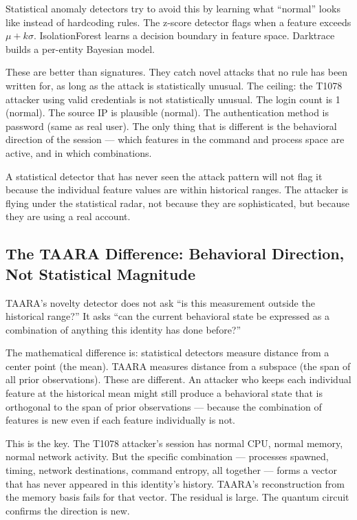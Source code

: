 \documentclass[11pt,a4paper]{article}
\begin{document}
Statistical anomaly detectors try to avoid this by learning what ``normal'' looks like instead of hardcoding rules. The z-score detector flags when a feature exceeds $\mu + k\sigma$. IsolationForest learns a decision boundary in feature space. Darktrace builds a per-entity Bayesian model.

These are better than signatures. They catch novel attacks that no rule has been written for, as long as the attack is statistically unusual. The ceiling: the T1078 attacker using valid credentials is not statistically unusual. The login count is 1 (normal). The source IP is plausible (normal). The authentication method is password (same as real user). The only thing that is different is the behavioral direction of the session — which features in the command and process space are active, and in which combinations.

A statistical detector that has never seen the attack pattern will not flag it because the individual feature values are within historical ranges. The attacker is flying under the statistical radar, not because they are sophisticated, but because they are using a real account.

\subsection{The TAARA Difference: Behavioral Direction, Not Statistical Magnitude}

TAARA's novelty detector does not ask ``is this measurement outside the historical range?'' It asks ``can the current behavioral state be expressed as a combination of anything this identity has done before?''

The mathematical difference is: statistical detectors measure distance from a center point (the mean). TAARA measures distance from a subspace (the span of all prior observations). These are different. An attacker who keeps each individual feature at the historical mean might still produce a behavioral state that is orthogonal to the span of prior observations — because the combination of features is new even if each feature individually is not.

This is the key. The T1078 attacker's session has normal CPU, normal memory, normal network activity. But the specific combination — processes spawned, timing, network destinations, command entropy, all together — forms a vector that has never appeared in this identity's history. TAARA's reconstruction from the memory basis fails for that vector. The residual is large. The quantum circuit confirms the direction is new.
\end{document}

